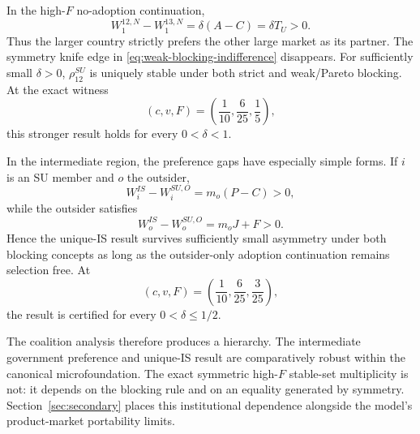 In the high-$F$ no-adoption continuation,
\begin{equation}
    W_1^{12,N}-W_1^{13,N}
    =
    \delta(A-C)
    =
    \delta T_U>0.
    \label{eq:asymmetric-partner-gap}
\end{equation}
Thus the larger country strictly prefers the other large market as its partner. The symmetry knife edge in \eqref{eq:weak-blocking-indifference} disappears. For sufficiently small $\delta>0$, $\rho_{12}^{SU}$ is uniquely stable under both strict and weak/Pareto blocking. At the exact witness
\[
(c,v,F)=
\left(\frac1{10},\frac6{25},\frac15\right),
\]
this stronger result holds for every $0<\delta<1$.

In the intermediate region, the preference gaps have especially simple forms. If $i$ is an SU member and $o$ the outsider,
\begin{equation}
    W_i^{IS}-W_i^{SU,O}
    =
    m_o(P-C)>0,
    \label{eq:asym-member-is-gap}
\end{equation}
while the outsider satisfies
\begin{equation}
    W_o^{IS}-W_o^{SU,O}
    =
    m_oJ+F>0.
    \label{eq:asym-outsider-is-gap}
\end{equation}
Hence the unique-IS result survives sufficiently small asymmetry under both blocking concepts as long as the outsider-only adoption continuation remains selection free. At
\[
(c,v,F)=
\left(\frac1{10},\frac6{25},\frac3{25}\right),
\]
the result is certified for every $0<\delta\leq1/2$.

The coalition analysis therefore produces a hierarchy. The intermediate government preference and unique-IS result are comparatively robust within the canonical microfoundation. The exact symmetric high-$F$ stable-set multiplicity is not: it depends on the blocking rule and on an equality generated by symmetry. Section~\ref{sec:secondary} places this institutional dependence alongside the model's product-market portability limits.
